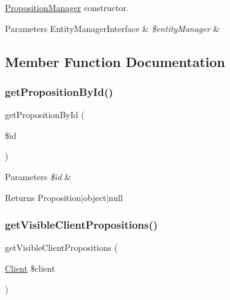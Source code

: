 \mbox{\hyperlink{class_app_1_1_b_l_1_1_proposition_manager}{Proposition\+Manager}} constructor. 
\begin{DoxyParams}[1]{Parameters}
Entity\+Manager\+Interface & {\em \$entity\+Manager} & \\
\hline
\end{DoxyParams}


\subsection{Member Function Documentation}
\mbox{\label{class_app_1_1_b_l_1_1_proposition_manager_a1ca3dd3ecd86e6bebe9dadadd01c8eda}} 
\subsubsection{\texorpdfstring{getPropositionById()}{getPropositionById()}}
{\footnotesize\ttfamily get\+Proposition\+By\+Id (\begin{DoxyParamCaption}\item[{}]{\$id }\end{DoxyParamCaption})}


\begin{DoxyParams}{Parameters}
{\em \$id} & \\
\hline
\end{DoxyParams}
\begin{DoxyReturn}{Returns}
Proposition$\vert$object$\vert$null 
\end{DoxyReturn}
\mbox{\label{class_app_1_1_b_l_1_1_proposition_manager_aa81d32fba76dd49892b709e948e72ba8}} 
\subsubsection{\texorpdfstring{getVisibleClientPropositions()}{getVisibleClientPropositions()}}
{\footnotesize\ttfamily get\+Visible\+Client\+Propositions (\begin{DoxyParamCaption}\item[{\mbox{\hyperlink{class_app_1_1_entity_1_1_client}{Client}}}]{\$client }\end{DoxyParamCaption})}


